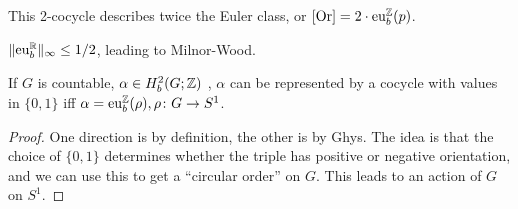 \begin{theorem}[Thurston]
    This 2-cocycle describes twice the Euler class, or $[\mathrm{Or}]=2 \cdot \mathrm{eu}_b ^{\mathbb{Z}}(p)$. 
\end{theorem}
\begin{cor}
    $\|\mathrm{eu}_b^{\mathbb{R}}\|_{\infty} \leq 1/2$, leading to Milnor-Wood.
\end{cor}
\begin{theorem}[Ghys]
    If $G$ is countable, $\alpha  \in H^2_b(G;\mathbb{Z})$ , $\alpha $ can be represented by a cocycle with values in $\{0,1\} $ iff $\alpha =\mathrm{eu}_b^{\mathbb{Z}}(\rho), \rho \colon G \to S^1 $.
\end{theorem}
\begin{proof}
    One direction is by definition, the other is by Ghys. The idea is that the choice of $\{0,1\} $ determines whether the triple has positive or negative orientation, and we can use this to get a ``circular order'' on $G$. This leads to an action of $G$ on  $S^1 $.
\end{proof}
